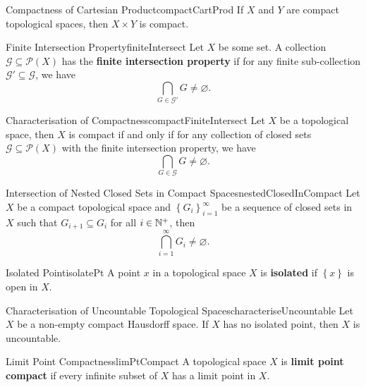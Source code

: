 \documentclass[math]{amznotes}
\theoremstyle{remark}
\begin{document}
\begin{corbox}{Compactness of Cartesian Product}{compactCartProd}
    If $X$ and $Y$ are compact topological spaces, then $X \times Y$ is compact.
\end{corbox}
\begin{dfnbox}{Finite Intersection Property}{finiteIntersect}
    Let $X$ be some set. A collection $\mathcal{G} \subseteq \mathcal{P}\left(X\right)$ has the {\color{red} \textbf{finite intersection property}} if for any finite sub-collection $\mathcal{G}' \subseteq \mathcal{G}$, we have 
    \begin{equation*}
        \bigcap_{G \in \mathcal{G}'}G \neq \varnothing.
    \end{equation*}
\end{dfnbox}
\begin{probox}{Characterisation of Compactness}{compactFiniteIntersect}
    Let $X$ be a topological space, then $X$ is compact if and only if for any collection of closed sets $\mathcal{G} \subseteq \mathcal{P}\left(X\right)$ with the finite intersection property, we have 
    \begin{equation*}
        \bigcap_{G \in \mathcal{G}}G \neq \varnothing.
    \end{equation*}
\end{probox}
\begin{corbox}{Intersection of Nested Closed Sets in Compact Spaces}{nestedClosedInCompact}
    Let $X$ be a compact topological space and $\left\{G_i\right\}_{i = 1}^{\infty}$ be a sequence of closed sets in $X$ such that $G_{i + 1} \subseteq G_i$ for all $i \in \mathbb{N}^+$, then 
    \begin{equation*}
        \bigcap_{i = 1}^{\infty}G_i \neq \varnothing.
    \end{equation*}
\end{corbox}
\begin{dfnbox}{Isolated Point}{isolatePt}
    A point $x$ in a topological space $X$ is {\color{red} \textbf{isolated}} if $\left\{x\right\}$ is open in $X$.
\end{dfnbox}
\begin{probox}{Characterisation of Uncountable Topological Spaces}{characteriseUncountable}
    Let $X$ be a non-empty compact Hausdorff space. If $X$ has no isolated point, then $X$ is uncountable.
\end{probox}
\begin{dfnbox}{Limit Point Compactness}{limPtCompact}
    A topological space $X$ is {\color{red} \textbf{limit point compact}} if every infinite subset of $X$ has a limit point in $X$.
\end{dfnbox}
\end{document}
